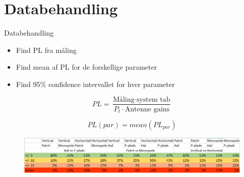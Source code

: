 \section{Databehandling}
\begin{frame}{Databehandling}

\begin{itemize}
\item Find PL fra måling
\item Find mean af PL for de forskellige parameter
\item Find 95\% confidence intervallet for hver parameter
\end{itemize}
\begin{minipage}{0.54\textwidth}
\begin{equation*}
PL = \frac{\text{Måling}\cdot\text{system tab}}{P_t \cdot\text{Antenne gains}}
\end{equation*}
\end{minipage}%
\begin{minipage}{0.45\textwidth}
\begin{equation*}
PL(par) = mean\left(PL_{par}\right)
\end{equation*}
\end{minipage}
\begin{figure}
\centering
\includegraphics[width=\columnwidth]{figures/Data.png}
\end{figure}
\end{frame}




